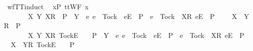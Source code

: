 \isanewline
{}\isamarkupfalse%
\ wf{\isacharunderscore}TT{}{\isacharunderscore}induct{\isacharcolon}\isanewline
\ \ {\isachardoublequoteopen}{\isasymforall}x{\isasymin}P{\isachardot}\ ttWF\ x\ {\isasymLongrightarrow}\isanewline
\ \ \ \ {\isacharparenleft}{\isasymAnd}\ {\isasymrho}\ {\isasymsigma}\ X\ Y{\isachardot}\ {\isacharparenleft}{\isacharbrackleft}{\isacharbrackleft}X{\isacharbrackright}\isactrlsub R{\isacharbrackright}\ {\isasymin}\ P\ {\isasymand}\ {\isacharparenleft}Y\ {\isasyminter}\ {\isacharbraceleft}e{\isachardot}\ {\isacharparenleft}e\ {\isasymnoteq}\ Tock\ {\isasymand}\ {\isacharbrackleft}{\isacharbrackleft}e{\isacharbrackright}\isactrlsub E{\isacharbrackright}\ {\isasymin}\ P{\isacharparenright}\ {\isasymor}\ {\isacharparenleft}e\ {\isacharequal}\ Tock\ {\isasymand}\ {\isacharbrackleft}{\isacharbrackleft}X{\isacharbrackright}\isactrlsub R{\isacharcomma}\ {\isacharbrackleft}e{\isacharbrackright}\isactrlsub E{\isacharbrackright}\ {\isasymin}\ P{\isacharparenright}\ {\isacharbraceright}\ {\isacharequal}\ {\isacharbraceleft}{\isacharbraceright}{\isacharparenright}{\isacharparenright}\ {\isasymLongrightarrow}\ {\isacharbrackleft}{\isacharbrackleft}X\ {\isasymunion}\ Y{\isacharbrackright}\isactrlsub R{\isacharbrackright}\ {\isasymin}\ P{\isacharparenright}\ {\isasymLongrightarrow}\isanewline
\ \ \ \ {\isacharparenleft}{\isasymAnd}\ {\isasymrho}\ {\isasymsigma}\ X\ Y{\isachardot}\ {\isacharparenleft}{\isacharbrackleft}{\isacharbrackleft}X{\isacharbrackright}\isactrlsub R{\isacharcomma}\ {\isacharbrackleft}Tock{\isacharbrackright}\isactrlsub E{\isacharbrackright}\ {\isacharat}\ {\isasymsigma}\ {\isasymin}\ P\ {\isasymand}\ {\isacharparenleft}Y\ {\isasyminter}\ {\isacharbraceleft}e{\isachardot}\ e\ {\isasymnoteq}\ Tock\ {\isasymand}\ {\isacharbrackleft}{\isacharbrackleft}e{\isacharbrackright}\isactrlsub E{\isacharbrackright}\ {\isasymin}\ P\ {\isasymor}\ e\ {\isacharequal}\ Tock\ {\isasymand}\ {\isacharbrackleft}{\isacharbrackleft}X{\isacharbrackright}\isactrlsub R{\isacharcomma}\ {\isacharbrackleft}e{\isacharbrackright}\isactrlsub E{\isacharbrackright}\ {\isasymin}\ P{\isacharbraceright}\ {\isacharequal}\ {\isacharbraceleft}{\isacharbraceright}{\isacharparenright}{\isacharparenright}\ {\isasymLongrightarrow}\ {\isacharbrackleft}{\isacharbrackleft}X\ {\isasymunion}\ Y{\isacharbrackright}\isactrlsub R{\isacharcomma}\ {\isacharbrackleft}Tock{\isacharbrackright}\isactrlsub E{\isacharbrackright}\ {\isacharat}\ {\isasymsigma}\ {\isasymin}\ P{\isacharparenright}\ {\isasymLongrightarrow}\isanewline
